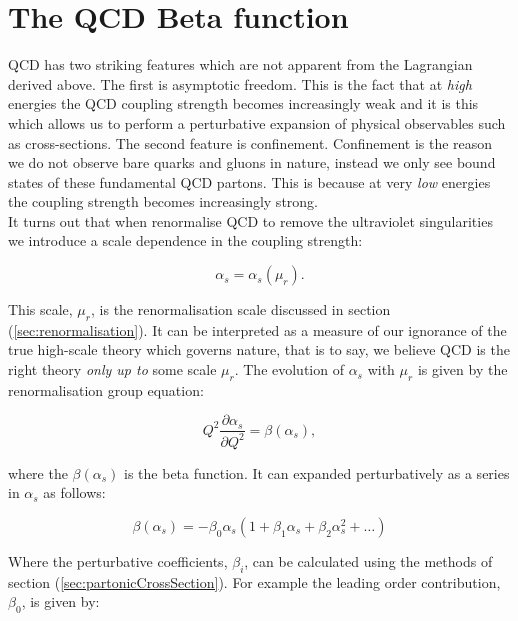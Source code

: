 \section{The QCD Beta function}
	\label{fig:betaFunction}

	QCD has two striking features which are not apparent from the Lagrangian derived above.  The first is asymptotic freedom.
	This is the fact that at \emph{high} energies the QCD coupling strength becomes increasingly weak and it is this which allows us to
	perform a perturbative expansion of physical observables such as cross-sections.  The second feature is confinement.  Confinement
	is the reason we do not observe bare quarks and gluons in nature, instead we only see bound states of these fundamental QCD partons.
	This is because at very \emph{low} energies the coupling strength becomes increasingly strong.\\It turns out that when
	renormalise QCD to remove the ultraviolet singularities we introduce a scale dependence in the coupling strength:

	\begin{equation}
		\alpha_s = \alpha_s(\mu_r).
	\end{equation}

	This scale, $\mu_r$, is the renormalisation scale discussed in section (\ref{sec:renormalisation}).  It can be interpreted as a measure of our ignorance of the
	true high-scale theory which governs nature, that is to say, we believe QCD is the right theory \emph{only up to} some
	scale $\mu_r$.  The evolution of $\alpha_s$ with $\mu_r$ is given by the renormalisation group equation:

	\begin{equation}
		Q^2\frac{\partial\alpha_s}{\partial Q^2} = \beta(\alpha_s),
		\label{eqn:RSFlow}
	\end{equation}

	where the $\beta(\alpha_s)$ is the beta function.  It can expanded perturbatively as a series in $\alpha_s$
	as follows:

	\begin{equation}
		\beta(\alpha_s) = -\beta_0\alpha_s\left(1 + \beta_1\alpha_s + \beta_2\alpha_s^2 + \ldots \right)
		\label{eqn:betaFunction}
	\end{equation}

	Where the perturbative coefficients, $\beta_i$, can be calculated using the methods of section (\ref{sec:partonicCrossSection}).
	For example the leading order contribution, $\beta_0$, is given by:

